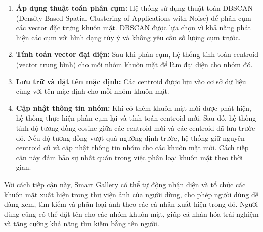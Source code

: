 \begin{enumerate}
    \item \textbf{Áp dụng thuật toán phân cụm:} Hệ thống sử dụng thuật toán DBSCAN (Density-Based Spatial Clustering of Applications with Noise)\cite{dbscan} để phân cụm các vector đặc trưng khuôn mặt. DBSCAN được lựa chọn vì khả năng phát hiện các cụm với hình dạng tùy ý và không yêu cầu số lượng cụm trước.
    
    \item \textbf{Tính toán vector đại diện:} Sau khi phân cụm, hệ thống tính toán centroid (vector trung bình) cho mỗi nhóm khuôn mặt để làm đại diện cho nhóm đó.
    
    \item \textbf{Lưu trữ và đặt tên mặc định:} Các centroid được lưu vào cơ sở dữ liệu cùng với tên mặc định cho mỗi nhóm khuôn mặt.
    
    \item \textbf{Cập nhật thông tin nhóm:} Khi có thêm khuôn mặt mới được phát hiện, hệ thống thực hiện phân cụm lại và tính toán centroid mới. Sau đó, hệ thống tính độ tương đồng cosine\cite{cosine} giữa các centroid mới và các centroid đã lưu trước đó. Nếu độ tương đồng vượt quá ngưỡng định trước, hệ thống giữ nguyên centroid cũ và cập nhật thông tin nhóm cho các khuôn mặt mới. Cách tiếp cận này đảm bảo sự nhất quán trong việc phân loại khuôn mặt theo thời gian.
\end{enumerate}

Với cách tiếp cận này, Smart Gallery có thể tự động nhận diện và tổ chức các khuôn mặt xuất hiện trong thư viện ảnh của người dùng, cho phép người dùng dễ dàng xem, tìm kiếm và phân loại ảnh theo các cá nhân xuất hiện trong đó. Người dùng cũng có thể đặt tên cho các nhóm khuôn mặt, giúp cá nhân hóa trải nghiệm và tăng cường khả năng tìm kiếm bằng tên người.

